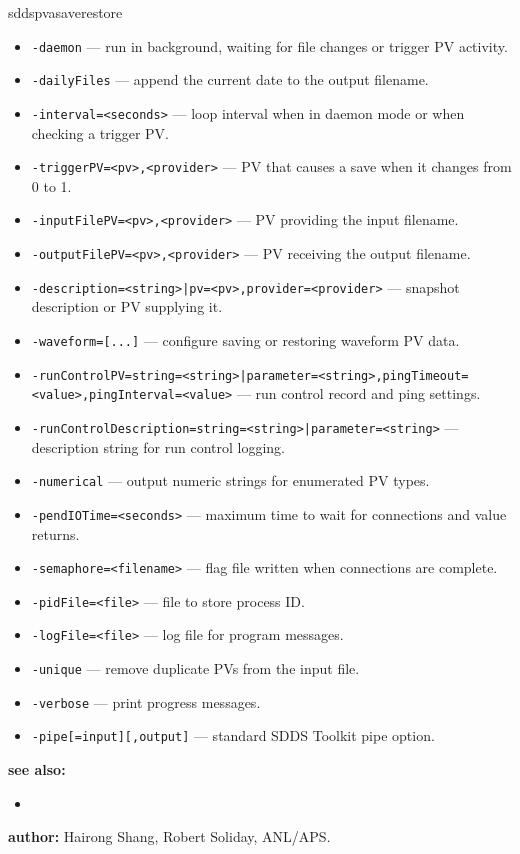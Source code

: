 \begin{sddsprog}{sddspvasaverestore}
\begin{itemize}
  \item {\tt -daemon} --- run in background, waiting for file changes or trigger PV activity.
  \item {\tt -dailyFiles} --- append the current date to the output filename.
  \item {\tt -interval=<seconds>} --- loop interval when in daemon mode or when checking a trigger PV.
  \item {\tt -triggerPV=<pv>,<provider>} --- PV that causes a save when it changes from 0 to 1.
  \item {\tt -inputFilePV=<pv>,<provider>} --- PV providing the input filename.
  \item {\tt -outputFilePV=<pv>,<provider>} --- PV receiving the output filename.
  \item {\tt -description=<string>|pv=<pv>,provider=<provider>} --- snapshot description or PV supplying it.
  \item {\tt -waveform=[...]} --- configure saving or restoring waveform PV data.
  \item {\tt -runControlPV={string=<string>|parameter=<string>},pingTimeout=<value>,pingInterval=<value>} --- run control record and ping settings.
  \item {\tt -runControlDescription={string=<string>|parameter=<string>}} --- description string for run control logging.
  \item {\tt -numerical} --- output numeric strings for enumerated PV types.
  \item {\tt -pendIOTime=<seconds>} --- maximum time to wait for connections and value returns.
  \item {\tt -semaphore=<filename>} --- flag file written when connections are complete.
  \item {\tt -pidFile=<file>} --- file to store process ID.
  \item {\tt -logFile=<file>} --- log file for program messages.
  \item {\tt -unique} --- remove duplicate PVs from the input file.
  \item {\tt -verbose} --- print progress messages.
  \item {\tt -pipe[=input][,output]} --- standard SDDS Toolkit pipe option.
\end{itemize}
\item \textbf{see also:}
\begin{itemize}
  \item {}
\end{itemize}
\item \textbf{author:} Hairong Shang, Robert Soliday, ANL/APS.
\end{sddsprog}
